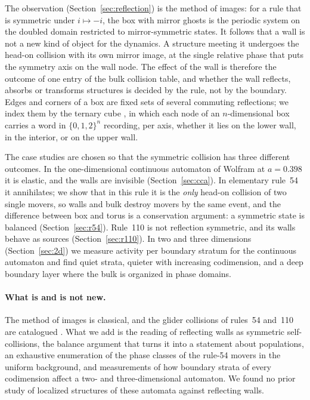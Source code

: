 \documentclass[11pt,a4paper]{article}
\theoremstyle{definition}
\theoremstyle{remark}
\begin{document}
The observation (Section~\ref{sec:reflection}) is the method of images:
for a rule that is symmetric under $i\mapsto-i$, the box with mirror
ghosts is the periodic system on the doubled domain restricted to
mirror-symmetric states. It follows that a wall is not a new kind of
object for the dynamics. A structure meeting it undergoes the head-on
collision with its own mirror image, at the single relative phase that
puts the symmetry axis on the wall node. The effect of the wall is
therefore the outcome of one entry of the bulk collision table, and
whether the wall reflects, absorbs or transforms structures is decided
by the rule, not by the boundary. Edges and corners of a box are fixed
sets of several commuting reflections; we index them by the ternary
cube \cite{TernaryCube}, in which each node of an $n$-dimensional box
carries a word in $\{0,1,2\}^n$ recording, per axis, whether it lies on
the lower wall, in the interior, or on the upper wall.

The case studies are chosen so that the symmetric collision has three
different outcomes. In the one-dimensional continuous automaton of
Wolfram \cite[ch.~4]{NKS} at $a=0.398$ it is elastic, and the walls are
invisible (Section~\ref{sec:cca}). In elementary rule~54
\cite{Boccara,HansonCrutchfield,Martinez2006,Martinez2014} it annihilates;
we show that in this rule it is the \emph{only} head-on collision of two
single movers, so walls and bulk destroy movers by the same event, and
the difference between box and torus is a conservation argument: a
symmetric state is balanced (Section~\ref{sec:r54}). Rule~110
\cite{Cook} is not reflection symmetric, and its walls behave as sources
(Section~\ref{sec:r110}). In two and three dimensions
(Section~\ref{sec:2d}) we measure activity per boundary stratum for the
continuous automaton and find quiet strata, quieter with increasing
codimension, and a deep boundary layer where the bulk is organized in
phase domains.

\paragraph{What is and is not new.} The method of images is classical,
and the glider collisions of rules~54 and~110 are catalogued
\cite{Boccara,HansonCrutchfield,Martinez2006,Martinez2014}. What we add
is the reading of reflecting walls as symmetric self-collisions, the
balance argument that turns it into a statement about populations, an
exhaustive enumeration of the phase classes of the rule-54 movers in
the uniform background, and measurements of how boundary strata of every
codimension affect a two- and three-dimensional automaton. We found no
prior study of localized structures of these automata against
reflecting walls.
\end{document}
